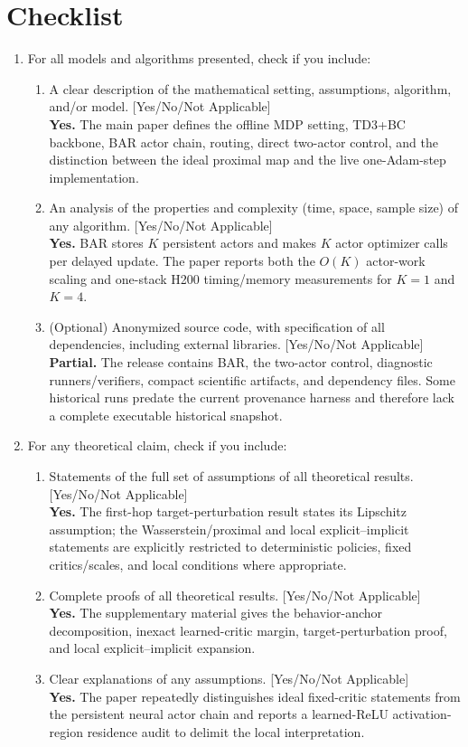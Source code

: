 \section*{Checklist}

\begin{enumerate}
\item For all models and algorithms presented, check if you include:
  \begin{enumerate}
  \item A clear description of the mathematical setting, assumptions, algorithm, and/or model. [Yes/No/Not Applicable]\\
  \textbf{Yes.} The main paper defines the offline MDP setting, TD3+BC backbone, BAR actor chain, routing, direct two-actor control, and the distinction between the ideal proximal map and the live one-Adam-step implementation.
  \item An analysis of the properties and complexity (time, space, sample size) of any algorithm. [Yes/No/Not Applicable]\\
  \textbf{Yes.} BAR stores $K$ persistent actors and makes $K$ actor optimizer calls per delayed update. The paper reports both the $O(K)$ actor-work scaling and one-stack H200 timing/memory measurements for $K=1$ and $K=4$.
  \item (Optional) Anonymized source code, with specification of all dependencies, including external libraries. [Yes/No/Not Applicable]\\
  \textbf{Partial.} The release contains BAR, the two-actor control, diagnostic runners/verifiers, compact scientific artifacts, and dependency files. Some historical runs predate the current provenance harness and therefore lack a complete executable historical snapshot.
  \end{enumerate}

\item For any theoretical claim, check if you include:
  \begin{enumerate}
  \item Statements of the full set of assumptions of all theoretical results. [Yes/No/Not Applicable]\\
  \textbf{Yes.} The first-hop target-perturbation result states its Lipschitz assumption; the Wasserstein/proximal and local explicit--implicit statements are explicitly restricted to deterministic policies, fixed critics/scales, and local conditions where appropriate.
  \item Complete proofs of all theoretical results. [Yes/No/Not Applicable]\\
  \textbf{Yes.} The supplementary material gives the behavior-anchor decomposition, inexact learned-critic margin, target-perturbation proof, and local explicit--implicit expansion.
  \item Clear explanations of any assumptions. [Yes/No/Not Applicable]\\
  \textbf{Yes.} The paper repeatedly distinguishes ideal fixed-critic statements from the persistent neural actor chain and reports a learned-ReLU activation-region residence audit to delimit the local interpretation.
  \end{enumerate}


\end{enumerate}
